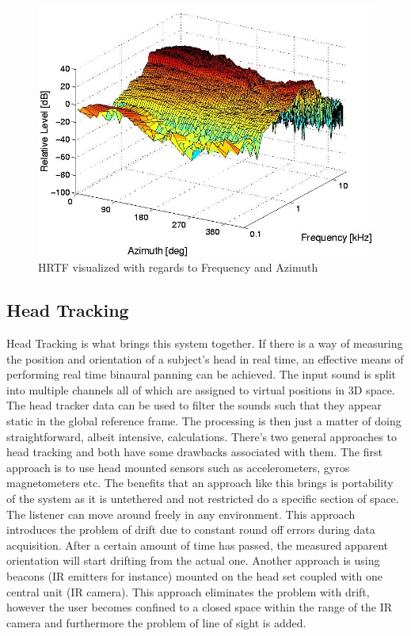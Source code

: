 \documentclass[a4paper,12pt,oneside]{article}
\begin{document}
\begin{center}
\begin{figure}[H]
    \centering
\includegraphics[scale=0.3]{hrtfsurf.jpg}    \caption{HRTF visualized with regards to Frequency and Azimuth}
    \label{fig:hrtf}
\end{figure}

\end{center}  
  
\subsection{Head Tracking}

Head Tracking is what brings this system together. If there is a way of measuring the position and orientation of a subject's head in real time, an effective means of performing real time binaural panning can be achieved. The input sound is split into multiple channels all of which are assigned to virtual positions in 3D space. The head tracker data can be used to filter the sounds such that they appear static in the global reference frame. The processing is then just a matter of doing straightforward, albeit intensive, calculations.
There's two general approaches to head tracking and both have some drawbacks associated with them. The first approach is to use head mounted sensors such as accelerometers, gyros magnetometers etc. The benefits that an approach like this brings is portability of the system as it is untethered and not restricted do a specific section of space. The listener can move around freely in any environment. This approach introduces the problem of drift due to constant round off errors during data acquisition. After a certain amount of time has passed, the measured apparent orientation will start drifting from the actual one.
Another approach is using beacons (IR emitters for instance) mounted on the head set coupled with one central unit (IR camera). This approach eliminates the problem with drift, however the user becomes confined to a closed space within the range of the IR camera and furthermore the problem of line of sight is added.\cite{rob1}\\ 
  
\end{document}
